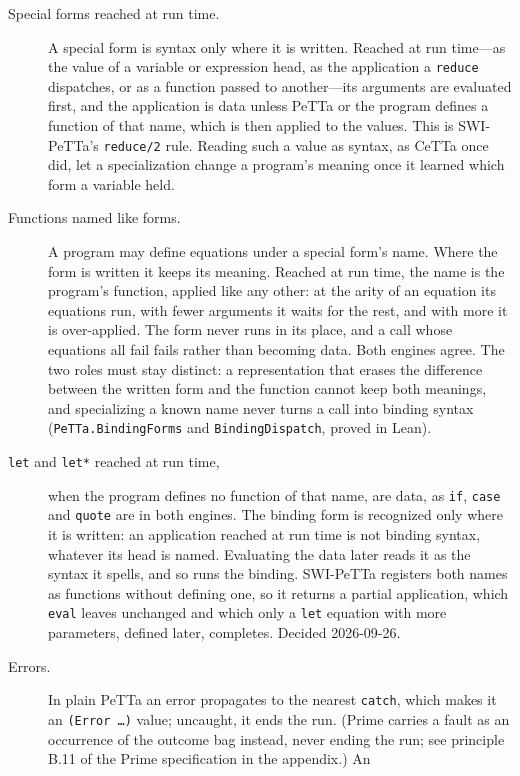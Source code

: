 \documentclass[11pt]{article}
\newcommand{\code}[1]{\texttt{#1}}
\newcommand{\PeTTa}{\textup{PeTTa}}
\newcommand{\CeTTa}{\textup{CeTTa}}
\begin{document}
\begin{description}
\item[Special forms reached at run time.] A special form is syntax only
  where it is written.  Reached at run time---as the value of a variable
  or expression head, as the application a \code{reduce} dispatches, or as
  a function passed to another---its arguments are evaluated first, and
  the application is data unless \PeTTa{} or the program defines a
  function of that name, which is then applied to the values.  This is
  SWI-\PeTTa{}'s \code{reduce/2} rule.  Reading such a value as syntax,
  as \CeTTa{} once did, let a specialization change a program's meaning
  once it learned which form a variable held.
\item[Functions named like forms.] A program may define equations under a
  special form's name.  Where the form is written it keeps its meaning.
  Reached at run time, the name is the program's function, applied like
  any other: at the arity of an equation its equations run, with fewer
  arguments it waits for the rest, and with more it is over-applied.  The
  form never runs in its place, and a call whose equations all fail
  fails rather than becoming data.  Both engines agree.  The two roles
  must stay distinct: a representation that erases the difference
  between the written form and the function cannot keep both meanings,
  and specializing a known name never turns a call into binding syntax
  (\code{PeTTa.BindingForms} and \code{BindingDispatch}, proved in Lean).
\item[\code{let} and \code{let*} reached at run time,] when the program
  defines no function of that name, are data, as \code{if}, \code{case}
  and \code{quote} are in both engines.  The binding form is recognized
  only where it is written: an application reached at run time is not
  binding syntax, whatever its head is named.  Evaluating the data later
  reads it as the syntax it spells, and so runs the binding.
  SWI-\PeTTa{} registers both names as functions without defining one, so
  it returns a partial application, which \code{eval} leaves unchanged and
  which only a \code{let} equation with more parameters, defined later,
  completes.  Decided 2026-09-26.
\item[Errors.] In plain \PeTTa{} an error propagates to the nearest
  \code{catch}, which makes it an \code{(Error \ldots)} value; uncaught, it
  ends the run.  (Prime carries a fault as an occurrence of the outcome
  bag instead, never ending the run; see principle B.11 of the Prime
  specification in the appendix.)  An

\end{description}
\end{document}
